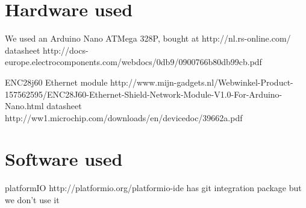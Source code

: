 \documentclass{article}
\begin{document}
	\section{Hardware used}
	We used an Arduino Nano ATMega 328P, bought at http://nl.rs-online.com/
	datasheet http://docs-europe.electrocomponents.com/webdocs/0db9/0900766b80db99cb.pdf
	
	ENC28j60 Ethernet module
	http://www.mijn-gadgets.nl/Webwinkel-Product-157562595/ENC28J60-Ethernet-Shield-Network-Module-V1.0-For-Arduino-Nano.html
	datasheet http://ww1.microchip.com/downloads/en/devicedoc/39662a.pdf
	\section{Software used}
	platformIO
	http://platformio.org/platformio-ide
	has git integration package but we don't use it
\end{document}
